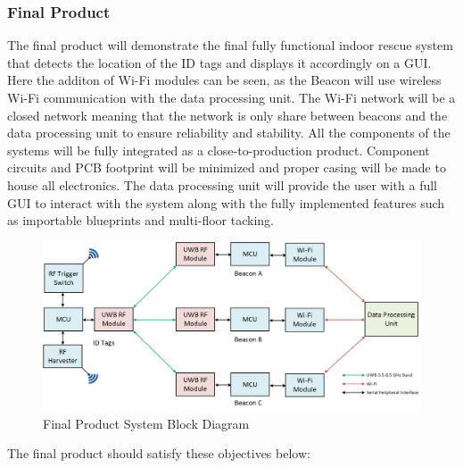 \subsubsection{Final Product}
The final product will demonstrate the final fully functional indoor rescue system that detects the location of the ID tags and displays it accordingly on a GUI. Here the additon of Wi-Fi modules can be seen, as the Beacon will use wireless Wi-Fi communication with the data processing unit. The Wi-Fi network will be a closed network meaning that the network is only share between beacons and the data processing unit to ensure reliability and stability. All the components of the systems will be fully integrated as a close-to-production product. Component circuits and \Gls{PCB} footprint will be minimized and proper casing will be made to house all electronics. The data processing unit will provide the user with a full GUI to interact with the system along with the fully implemented features such as importable blueprints and multi-floor tacking.
\medskip
\begin{figure}[h!]
    \centering
    \includegraphics[width=\linewidth]{./images/03_sys_Final.png}
    \caption{Final Product System Block Diagram}
    \label{final_prod_sys_blk}
\end{figure}
\bigskip

The final product should satisfy these objectives below:

